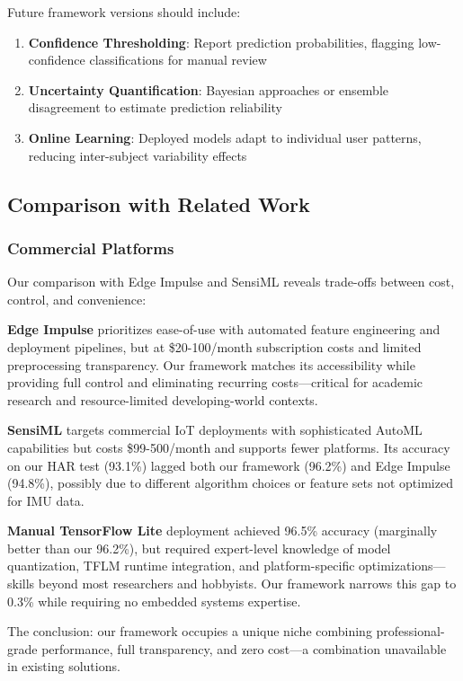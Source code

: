 Future framework versions should include:
\begin{enumerate}
    \item \textbf{Confidence Thresholding}: Report prediction probabilities, flagging low-confidence classifications for manual review
    \item \textbf{Uncertainty Quantification}: Bayesian approaches or ensemble disagreement to estimate prediction reliability
    \item \textbf{Online Learning}: Deployed models adapt to individual user patterns, reducing inter-subject variability effects
\end{enumerate}

\subsection{Comparison with Related Work}

\subsubsection{Commercial Platforms}
Our comparison with Edge Impulse and SensiML reveals trade-offs between cost, control, and convenience:

\textbf{Edge Impulse} prioritizes ease-of-use with automated feature engineering and deployment pipelines, but at \$20-100/month subscription costs and limited preprocessing transparency. Our framework matches its accessibility while providing full control and eliminating recurring costs—critical for academic research and resource-limited developing-world contexts.

\textbf{SensiML} targets commercial IoT deployments with sophisticated AutoML capabilities but costs \$99-500/month and supports fewer platforms. Its accuracy on our HAR test (93.1\%) lagged both our framework (96.2\%) and Edge Impulse (94.8\%), possibly due to different algorithm choices or feature sets not optimized for IMU data.

\textbf{Manual TensorFlow Lite} deployment achieved 96.5\% accuracy (marginally better than our 96.2\%), but required expert-level knowledge of model quantization, TFLM runtime integration, and platform-specific optimizations—skills beyond most researchers and hobbyists. Our framework narrows this gap to 0.3\% while requiring no embedded systems expertise.

The conclusion: our framework occupies a unique niche combining professional-grade performance, full transparency, and zero cost—a combination unavailable in existing solutions.

